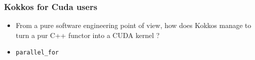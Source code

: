 \begin{frame}
  \frametitle{Kokkos for Cuda users}

  \begin{itemize}
  \item From a pure software engineering point of view, how does Kokkos manage to turn a pur C++ functor into a CUDA kernel ?
  \item \texttt{parallel\_for} 
  \end{itemize}

\end{frame}
